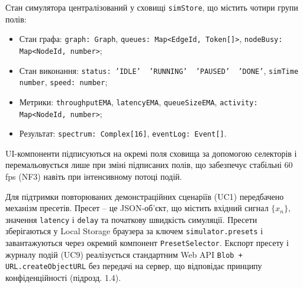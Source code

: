 \documentclass[
]{article}
\newcommand{\passthrough}[1]{#1}
\begin{document}
Стан симулятора централізований у сховищі
\passthrough{\lstinline!simStore!}, що містить чотири групи полів:

\begin{itemize}
\item
  Стан графа:
  \passthrough{\lstinline!graph:!}\passthrough{\lstinline! !}\passthrough{\lstinline!Graph!},
  \passthrough{\lstinline!queues:!}\passthrough{\lstinline! !}\passthrough{\lstinline!Map<!}\passthrough{\lstinline!EdgeId!}\passthrough{\lstinline!,!}\passthrough{\lstinline! !}\passthrough{\lstinline!Token[]>!},
  \passthrough{\lstinline!nodeBusy!}\passthrough{\lstinline!:!}\passthrough{\lstinline! !}\passthrough{\lstinline!Map<!}\passthrough{\lstinline!NodeId!}\passthrough{\lstinline!,!}\passthrough{\lstinline! !}\passthrough{\lstinline!number>!};
\item
  Стан виконання:
  \passthrough{\lstinline!status:!}\passthrough{\lstinline! !}\passthrough{\lstinline!’IDLE’!}\passthrough{\lstinline!  !}\passthrough{\lstinline!’RUNNING’!}\passthrough{\lstinline!  !}\passthrough{\lstinline!’PAUSED’!}\passthrough{\lstinline!  !}\passthrough{\lstinline!’DONE’!},
  \passthrough{\lstinline!simTime!}\passthrough{\lstinline! !}\passthrough{\lstinline!number!},
  \passthrough{\lstinline!speed:!}\passthrough{\lstinline! !}\passthrough{\lstinline!number!};
\item
  Метрики: \passthrough{\lstinline!throughputEMA!},
  \passthrough{\lstinline!latencyEMA!},
  \passthrough{\lstinline!queueSizeEMA!},
  \passthrough{\lstinline!activity:!}\passthrough{\lstinline! !}\passthrough{\lstinline!Map<!}\passthrough{\lstinline!NodeId!}\passthrough{\lstinline!,!}\passthrough{\lstinline! !}\passthrough{\lstinline!number>!};
\item
  Результат:
  \passthrough{\lstinline!spectrum:!}\passthrough{\lstinline! !}\passthrough{\lstinline!Complex[16]!},
  \passthrough{\lstinline!eventLog!}\passthrough{\lstinline!:!}\passthrough{\lstinline! !}\passthrough{\lstinline!Event[]!}.
\end{itemize}

UI-компоненти підписуються на окремі поля сховища за допомогою
селекторів і перемальовується лише при зміні підписаних полів, що
забезпечує стабільні 60 fps (NF3) навіть при інтенсивному потоці подій.

Для підтримки повторюваних демонстраційних сценаріїв (UC1) передбачено
механізм пресетів. Пресет -- це JSON-об'єкт, що містить вхідний сигнал
\(\{ x_{n}\}\), значення \passthrough{\lstinline!latency!} і
\passthrough{\lstinline!delay!} та початкову швидкість симуляції.
Пресети зберігаються у Local Storage браузера за ключем
\passthrough{\lstinline!simulator!}\passthrough{\lstinline!.!}\passthrough{\lstinline!presets!}
і завантажуються через окремий компонент
\passthrough{\lstinline!PresetSelector!}. Експорт пресету і журналу
подій (UC9) реалізується стандартним Web API
\passthrough{\lstinline!Blob!}\passthrough{\lstinline! !}\passthrough{\lstinline!+!}\passthrough{\lstinline! !}\passthrough{\lstinline!URL!}\passthrough{\lstinline!.!}\passthrough{\lstinline!createObjectURL!}
без передачі на сервер, що відповідає принципу конфіденційності
(підрозд. 1.4).
\end{document}
